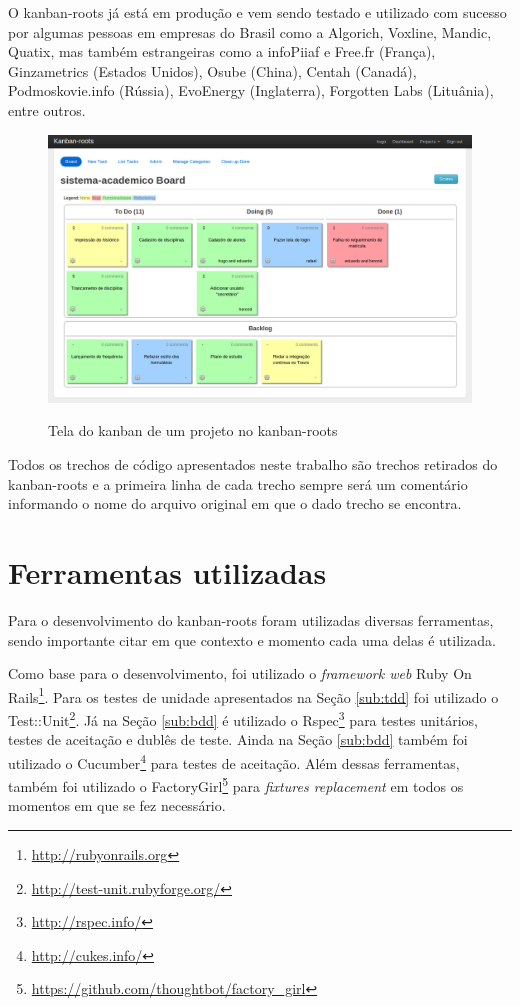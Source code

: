 O kanban-roots já está em produção e vem sendo testado e utilizado com sucesso por algumas pessoas em empresas do Brasil como a Algorich, Voxline, Mandic, Quatix, mas também estrangeiras como a infoPiiaf e Free.fr (França), Ginzametrics (Estados Unidos), Osube (China), Centah (Canadá), Podmoskovie.info (Rússia), EvoEnergy (Inglaterra), Forgotten Labs (Lituânia), entre outros.

\begin{figure}[h]
  \center
  \caption{Tela do kanban de um projeto no kanban-roots}
  \includegraphics[scale=0.45]{images/kanban-roots}
  \label{img:tela_kaban_roots}
\end{figure}

Todos os trechos de código apresentados neste trabalho são trechos retirados do kanban-roots e a primeira linha de cada trecho sempre será um comentário informando o nome do arquivo original em que o dado trecho se encontra.

\section{Ferramentas utilizadas}

Para o desenvolvimento do kanban-roots foram utilizadas diversas ferramentas, sendo importante citar em que contexto e momento cada uma delas é utilizada.

Como base para o desenvolvimento, foi utilizado o \textit{framework web} Ruby On Rails\footnote{\url{http://rubyonrails.org}}. Para os testes de unidade apresentados na Seção \ref{sub:tdd} foi utilizado o Test::Unit\footnote{\url{http://test-unit.rubyforge.org/}}. Já na Seção \ref{sub:bdd} é utilizado o Rspec\footnote{\url{http://rspec.info/}} para testes unitários, testes de aceitação e dublês de teste. Ainda na Seção \ref{sub:bdd} também foi utilizado o Cucumber\footnote{\url{http://cukes.info/}} para testes de aceitação. Além dessas ferramentas, também foi utilizado o FactoryGirl\footnote{\url{https://github.com/thoughtbot/factory_girl}} para \textit{fixtures replacement} em todos os momentos em que se fez necessário.


